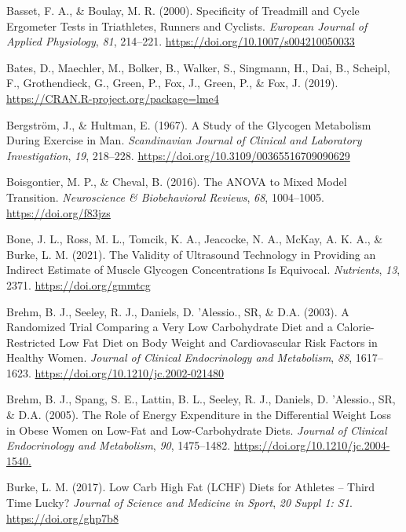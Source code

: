 \documentclass[]{cik}%
\newlength{\cslhangindent}
\newlength{\cslentryspacingunit} %
\newenvironment{CSLReferences}[2] %
 {%
  \setlength{\parindent}{0pt}
  \ifodd #1
  \let\oldpar\par
  \def\par{\hangindent=\cslhangindent\oldpar}
  \fi
  \setlength{\parskip}{#2\cslentryspacingunit}
 }%
 {}
\begin{document}
\hypertarget{refs}{}
\begin{CSLReferences}{1}{0}
\leavevmode{}%
Basset, F. A., \& Boulay, M. R. (2000). Specificity of Treadmill and
Cycle Ergometer Tests in Triathletes, Runners and Cyclists.
\emph{European Journal of Applied Physiology}, \emph{81}, 214--221.
\url{https://doi.org/10.1007/s004210050033}

\leavevmode{}%
Bates, D., Maechler, M., Bolker, B., Walker, S., Singmann, H., Dai, B.,
Scheipl, F., Grothendieck, G., Green, P., Fox, J., Green, P., \& Fox, J.
(2019). \url{https://CRAN.R-project.org/package=lme4}

\leavevmode{}%
Bergström, J., \& Hultman, E. (1967). A Study of the Glycogen Metabolism
During Exercise in Man. \emph{Scandinavian Journal of Clinical and
Laboratory Investigation}, \emph{19}, 218--228.
\url{https://doi.org/10.3109/00365516709090629}

\leavevmode{}%
Boisgontier, M. P., \& Cheval, B. (2016). The ANOVA to Mixed Model
Transition. \emph{Neuroscience \& Biobehavioral Reviews}, \emph{68},
1004--1005. \url{https://doi.org/f83jzs}

\leavevmode{}%
Bone, J. L., Ross, M. L., Tomcik, K. A., Jeacocke, N. A., McKay, A. K.
A., \& Burke, L. M. (2021). The Validity of Ultrasound Technology in
Providing an Indirect Estimate of Muscle Glycogen Concentrations Is
Equivocal. \emph{Nutrients}, \emph{13}, 2371.
\url{https://doi.org/gmmtcg}

\leavevmode{}%
Brehm, B. J., Seeley, R. J., Daniels, D. 'Alessio., SR, \& D.A. (2003).
A Randomized Trial Comparing a Very Low Carbohydrate Diet and a
Calorie-Restricted Low Fat Diet on Body Weight and Cardiovascular Risk
Factors in Healthy Women. \emph{Journal of Clinical Endocrinology and
Metabolism}, \emph{88}, 1617--1623.
\url{https://doi.org/10.1210/jc.2002-021480}

\leavevmode{}%
Brehm, B. J., Spang, S. E., Lattin, B. L., Seeley, R. J., Daniels, D.
'Alessio., SR, \& D.A. (2005). The Role of Energy Expenditure in the
Differential Weight Loss in Obese Women on Low-Fat and Low-Carbohydrate
Diets. \emph{Journal of Clinical Endocrinology and Metabolism},
\emph{90}, 1475--1482. \url{https://doi.org/10.1210/jc.2004-1540.}

\leavevmode{}%
Burke, L. M. (2017). Low Carb High Fat (LCHF) Diets for Athletes --
Third Time Lucky? \emph{Journal of Science and Medicine in Sport},
\emph{20 Suppl 1: S1}. \url{https://doi.org/ghp7b8}


\end{CSLReferences}
\end{document}
